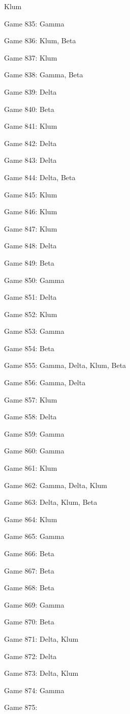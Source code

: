 \documentclass{article}
\begin{document}
\begin{multicols}{3}
\begin{compactitem}
Klum
\item Game 835:
Gamma
\item Game 836:
Klum, Beta
\item Game 837:
Klum
\item Game 838:
Gamma, Beta
\item Game 839:
Delta
\item Game 840:
Beta
\item Game 841:
Klum
\item Game 842:
Delta
\item Game 843:
Delta
\item Game 844:
Delta, Beta
\item Game 845:
Klum
\item Game 846:
Klum
\item Game 847:
Klum
\item Game 848:
Delta
\item Game 849:
Beta
\item Game 850:
Gamma
\item Game 851:
Delta
\item Game 852:
Klum
\item Game 853:
Gamma
\item Game 854:
Beta
\item Game 855:
Gamma, Delta, Klum, Beta
\item Game 856:
Gamma, Delta
\item Game 857:
Klum
\item Game 858:
Delta
\item Game 859:
Gamma
\item Game 860:
Gamma
\item Game 861:
Klum
\item Game 862:
Gamma, Delta, Klum
\item Game 863:
Delta, Klum, Beta
\item Game 864:
Klum
\item Game 865:
Gamma
\item Game 866:
Beta
\item Game 867:
Beta
\item Game 868:
Beta
\item Game 869:
Gamma
\item Game 870:
Beta
\item Game 871:
Delta, Klum
\item Game 872:
Delta
\item Game 873:
Delta, Klum
\item Game 874:
Gamma
\item Game 875:

\end{compactitem}
\end{multicols}
\end{document}
